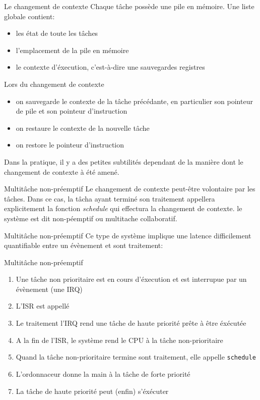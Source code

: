 \begin{frame}{Le changement de contexte}
  Chaque tâche possède une pile en mémoire. Une liste globale contient:
  \begin{itemize} 
  \item les état de toute les tâches
  \item l'emplacement de la pile en mémoire
  \item le contexte d'éxecution, c'est-à-dire une sauvegardes registres
  \end{itemize} 
  Lors du changement de contexte
  \begin{itemize} 
  \item  on  sauvegarde  le   contexte  de  la  tâche  précédante,  en
    particulier son pointeur de pile et son pointeur d'instruction
  \item on restaure le contexte de la nouvelle tâche
  \item on restore le pointeur d'instruction
  \end{itemize} 
  Dans  la pratique, il  y a  des petites  subtilités dependant  de la
  manière dont le changement de contexte à été amené.
\end{frame} 

\begin{frame}{Multitâche non-préemptif}
  Le changement de contexte  peut-être volontaire par les tâches. Dans
  ce   cas,  la   tâcha   ayant  terminé   son  traitement   appellera
  explicitement   la  fonction   \emph{schedule}   qui  effectura   la
  changement  de   contexte.  le  système  est   dit  non-péemptif  ou
  multitache collaboratif.
\end{frame}

\begin{frame}{Multitâche non-préemptif}
  Ce type  de système implique une  latence difficilement quantifiable
  entre un évènement et sont traitement:
  \begin{center}
  \end{center}
\end{frame}

\begin{frame}{Multitâche non-préemptif}
  \begin{enumerate} 
  \item  Une tâche  non prioritaire  est en  cours d'éxecution  et est
    interrupue par un évènement (une IRQ)
  \item L'ISR est appellé
  \item Le traitement  l'IRQ rend une tâche de  haute priorité prête à
    être éxécutée
  \item  A  la fin  de  l'ISR,  le système  rend  le  CPU  à la  tâche
    non-prioritaire
  \item Quand  la tâche non-prioritaire termine  sont traitement, elle
    appelle \texttt{schedule}
  \item L'ordonnaceur donne la main à la tâche de forte priorité
  \item La tâche de haute priorité peut (enfin) s'éxécuter
  \end{enumerate} 
\end{frame} 

